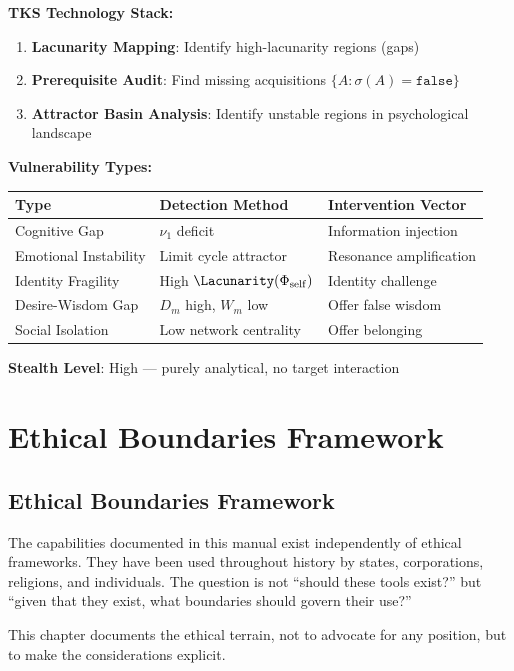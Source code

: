 \documentclass[11pt,twoside]{book}
\newcommand{\noe}[1]{\nu_{#1}}
\newcommand{\Frac}{\Phi}
\begin{document}
\begin{tcolorbox}[colback=yellow!5!white,colframe=yellow!65!black,title=\textbf{Vulnerability Identification Capability}]
\textbf{TKS Technology Stack:}
\begin{enumerate}
    \item \textbf{Lacunarity Mapping}: Identify high-lacunarity regions (gaps)
    \item \textbf{Prerequisite Audit}: Find missing acquisitions $\{A : \sigma(A) = \mathtt{false}\}$
    \item \textbf{Attractor Basin Analysis}: Identify unstable regions in psychological landscape
\end{enumerate}

\textbf{Vulnerability Types:}
\begin{center}
\small
\begin{tabular}{l|l|l}
\textbf{Type} & \textbf{Detection Method} & \textbf{Intervention Vector} \\
\hline
Cognitive Gap & $\noe{1}$ deficit & Information injection \\
Emotional Instability & Limit cycle attractor & Resonance amplification \\
Identity Fragility & High $\Lacunarity(\Frac_{\mathrm{self}})$ & Identity challenge \\
Desire-Wisdom Gap & $D_m$ high, $W_m$ low & Offer false wisdom \\
Social Isolation & Low network centrality & Offer belonging \\
\end{tabular}
\end{center}

\textbf{Stealth Level}: High --- purely analytical, no target interaction
\end{tcolorbox}

\part{Ethical Boundaries Framework}

\chapter{Ethical Boundaries Framework}
\label{ch:ethics}

\begin{tcolorbox}[colback=gray!10!white,colframe=gray!75!black,title=\textbf{Framing Note}]
The capabilities documented in this manual exist independently of ethical frameworks.
They have been used throughout history by states, corporations, religions, and
individuals. The question is not ``should these tools exist?'' but ``given that
they exist, what boundaries should govern their use?''

This chapter documents the ethical terrain, not to advocate for any position,
but to make the considerations explicit.
\end{tcolorbox}
\end{document}
